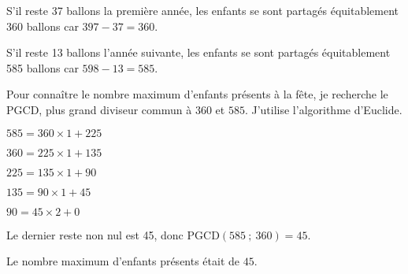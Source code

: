 
\medskip

%
%
%
%

S’il reste 37 ballons la première année, les enfants se sont partagés équitablement 360
ballons car $397 - 37 = 360$.

S’il reste 13 ballons l'année suivante, les enfants se sont partagés équitablement 585
ballons car $598 - 13 = 585$.

Pour connaître le nombre maximum d’enfants présents à la fête, je recherche le PGCD,
plus grand diviseur commun à $360$ et $585$. J’utilise l’algorithme d’Euclide.

$585 = 360 \times 1 + 225$

$360 = 225 \times 1 + 135$

$225 =135 \times 1 + 90$

$135 = 90 \times 1 + 45$

$90 = 45 \times 2 + 0$

Le dernier reste non nul est 45, donc PGCD$(585~;~360) = 45$.

Le nombre maximum d’enfants présents était de $45$.
\vspace{0,5cm}

